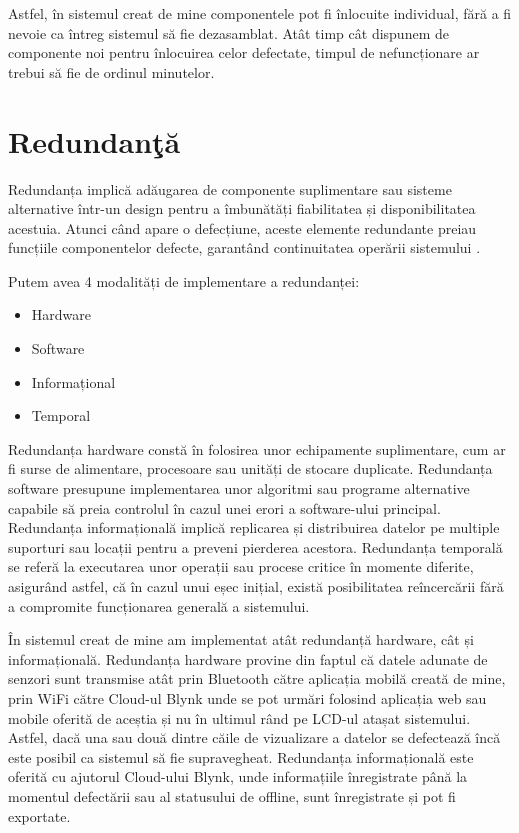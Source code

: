 Astfel, în sistemul creat de mine componentele pot fi înlocuite individual, fără a fi nevoie ca întreg sistemul să fie dezasamblat. Atât timp cât dispunem de componente noi pentru înlocuirea celor defectate, timpul de nefuncționare ar trebui să fie de ordinul minutelor.

\section{Redundanţă}
Redundanța implică adăugarea de componente suplimentare sau sisteme alternative într-un design pentru a îmbunătăți fiabilitatea și disponibilitatea acestuia. Atunci când apare o defecțiune, aceste elemente redundante preiau funcțiile componentelor defecte, garantând continuitatea operării sistemului \cite{fault_tolerant}.

Putem avea 4 modalități de implementare a redundanței:

\begin{itemize}
\item Hardware
\item Software
\item Informațional
\item Temporal
\end{itemize}

Redundanța hardware constă în folosirea unor echipamente suplimentare, cum ar fi surse de alimentare, procesoare sau unități de stocare duplicate. Redundanța software presupune implementarea unor algoritmi sau programe alternative capabile să preia controlul în cazul unei erori a software-ului principal. Redundanța informațională implică replicarea și distribuirea datelor pe multiple suporturi sau locații pentru a preveni pierderea acestora. Redundanța temporală se referă la executarea unor operații sau procese critice în momente diferite, asigurând astfel, că în cazul unui eșec inițial, există posibilitatea reîncercării fără a compromite funcționarea generală a sistemului.

În sistemul creat de mine am implementat atât redundanță hardware, cât și informațională. Redundanța hardware provine din faptul că datele adunate de senzori sunt transmise atât prin Bluetooth către aplicația mobilă creată de mine, prin WiFi către Cloud-ul Blynk unde se pot urmări folosind aplicația web sau mobile oferită de aceștia și nu în ultimul rând pe LCD-ul atașat sistemului. Astfel, dacă una sau două dintre căile de vizualizare a datelor se defectează încă este posibil ca sistemul să fie supravegheat. Redundanța informațională este oferită cu ajutorul Cloud-ului Blynk, unde informațiile înregistrate până la momentul defectării sau al statusului de offline, sunt înregistrate și pot fi exportate.

